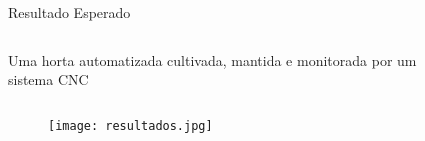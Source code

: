 \begin{frame}[t]{Resultado Esperado}
    \transboxout[duration=0.5]
    \vspace*{0.2cm}
    \begin{columns}
                \Large{Uma horta automatizada cultivada, mantida e monitorada por um \\
                    sistema CNC \\
                }
    \end{columns}
    
    \vspace*{0.3cm}
    \begin{figure}
        \texttt{[image: resultados.jpg]}
    \end{figure}
\end{frame}

